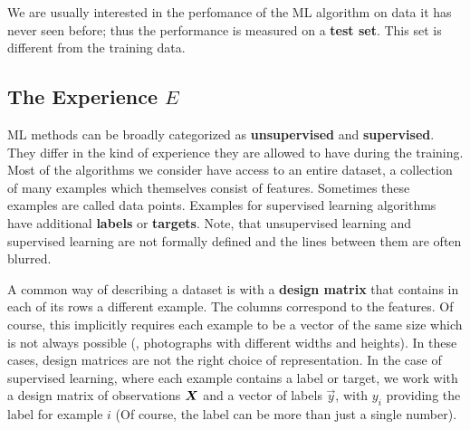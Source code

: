 We are usually interested in the perfomance of the ML algorithm on
data it has never seen before; thus the performance is measured on a
\textbf{test set}. This set is different from the training data.

\subsection*{The Experience $E$}
ML methods can be broadly categorized as \textbf{unsupervised} and
\textbf{supervised}. They differ in the kind of experience they are
allowed to have during the training. Most of the algorithms we
consider have access to an entire dataset, \ie a collection of many
examples which themselves consist of features. Sometimes these
examples are called data points. Examples for supervised learning
algorithms have additional \textbf{labels} or \textbf{targets}. Note,
that unsupervised learning and supervised learning are not formally
defined and the lines between them are often blurred.

A common way of describing a dataset is with a \textbf{design matrix}
that contains in each of its rows a different example. The columns
correspond to the features. Of course, this implicitly requires each
example to be a vector of the same size which is not always possible
(\eg, photographs with different widths and heights). In these cases,
design matrices are not the right choice of representation. In the
case of supervised learning, where each example contains a label or
target, we work with a design matrix of observations $\bm{X}$ and a
vector of labels $\vec{y}$, with $y_i$ providing the label for example
$i$ (Of course, the label can be more than just a single number).
